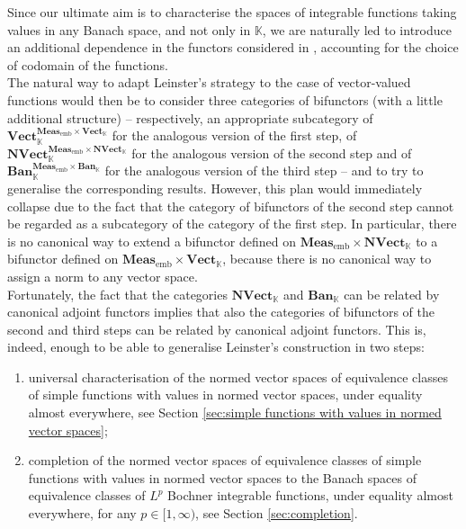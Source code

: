 \documentclass{amsart}
\theoremstyle{definition}
\theoremstyle{plain}
\newcommand{\K}{\mathbb{K}}
\newcommand{\embMeas}{\mathbf{Meas}_\mathrm{emb}}
\newcommand{\Vect}{\mathbf{Vect}_{\mathbb{K}}}
\newcommand{\NVect}{\mathbf{NVect}_{\mathbb{K}}}
\newcommand{\Ban}{\mathbf{Ban}_{\mathbb{K}}}
\begin{document}
        Since our ultimate aim is to characterise the spaces of integrable functions taking values in any Banach space, and not only in $\K$, we are naturally led to introduce an additional dependence in the functors considered in \cite{Leinster2023}, accounting for the choice of codomain of the functions. \\
        The natural way to adapt Leinster's strategy to the case of vector-valued functions would then be to consider three categories of bifunctors (with a little additional structure) -- respectively, an appropriate subcategory of $\Vect^{\embMeas \times \Vect}$ for the analogous version of the first step, of $\NVect^{\embMeas \times \NVect}$ for the analogous version of the second step and of $\Ban^{\embMeas \times \Ban}$ for the analogous version of the third step -- and to try to generalise the corresponding results.
        However, this plan would immediately collapse due to the fact that the category of bifunctors of the second step cannot be regarded as a subcategory of the category of the first step. 
        In particular, there is no canonical way to extend a bifunctor defined on $\embMeas \times \NVect$ to a bifunctor defined on $\embMeas \times \Vect$, because there is no canonical way to assign a norm to any vector space. \\
        Fortunately, the fact that the categories $\NVect$ and $\Ban$ can be related by canonical adjoint functors implies that also the categories of bifunctors of the second and third steps can be related by canonical adjoint functors.
        This is, indeed, enough to be able to generalise Leinster's construction in two steps:
        \begin{enumerate}
            \item universal characterisation of the normed vector spaces of equivalence classes of simple functions with values in normed vector spaces, under equality almost everywhere, see Section \ref{sec:simple functions with values in normed vector spaces};
            \item completion of the normed vector spaces of equivalence classes of simple functions with values in normed vector spaces to the Banach spaces of equivalence classes of $L^p$ Bochner integrable functions, under equality almost everywhere, for any $p \in [1,\infty)$, see Section \ref{sec:completion}.
        \end{enumerate}
\end{document}
